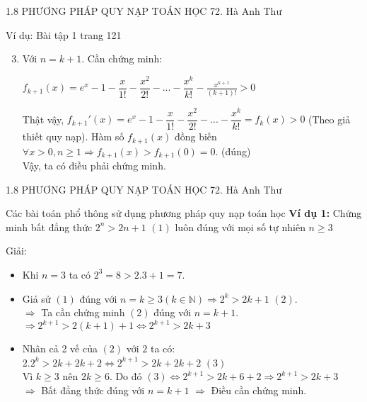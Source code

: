 \begin{frame}{1.8 PHƯƠNG PHÁP QUY NẠP TOÁN HỌC \hspace{2cm}  72. Hà Anh Thư} 
\begin{block}{Ví dụ: Bài tập 1 trang 121}
\begin{enumerate}
    \setcounter{enumi}{2}
    \item Với $n = k + 1$. Cần chứng minh:
    \begin{center}
        $f_{k + 1}(x) = e^x - 1 - \dfrac{x}{1!} - \dfrac{x^2}{2!} - ... - \dfrac{x^k}{k!} - \frac{x^{k + 1}}{(k + 1)!} > 0$
    \end{center}
    \pause
    Thật vậy,
    $f_{k + 1}'(x) = e^x - 1 - \dfrac{x}{1!} - \dfrac{x^2}{2!} - ... - \dfrac{x^k}{k!} = f_k(x) > 0$ (Theo giả thiết quy nạp).
    \pause
    Hàm số $f_{k + 1}(x)$ đồng biến $\forall x > 0, n \ge 1 \Rightarrow f_{k + 1}(x) > f_{k + 1}(0) = 0$. (đúng) \\
    Vậy, ta có điều phải chứng minh.
\end{enumerate}
\end{block}

\end{frame}

\begin{frame}{1.8 PHƯƠNG PHÁP QUY NẠP TOÁN HỌC \hspace{2cm}  72. Hà Anh Thư} 
\begin{block}{Các bài toán phổ thông sử dụng phương pháp quy nạp toán học}
\textbf{Ví dụ 1:} Chứng minh bất đẳng thức $2^n > 2n + 1$ $(1)$ luôn đúng với mọi số tự nhiên $n \ge 3$ \\
\pause
\begin{center}
    Giải:
\end{center}
\begin{itemize}
    \item Khi $n = 3$ ta có $2^3 = 8 > 2.3 + 1 = 7$.
    \pause
    \item Giả sử $(1)$ đúng với $n = k \ge 3 (k \in \mathbb{N}) \Rightarrow 2^k > 2k + 1$ $(2)$. \\
        \pause
        $\Rightarrow$ Ta cần chứng minh $(2)$ đúng với $n = k + 1$. \\
        \pause
        $\Rightarrow 2^{k + 1} > 2(k + 1) + 1 \Leftrightarrow 2^{k + 1} > 2k + 3$ \\
        \pause
    \item Nhân cả 2 vế của $(2)$ với $2$ ta có: \\
        $2.2^k > 2k + 2k + 2 \Leftrightarrow 2^{k + 1} > 2k + 2k + 2$ $(3)$ \\
        \pause
        Vì $k \ge 3$ nên $2k \ge 6$. Do đó $(3) \Leftrightarrow 2^{k + 1} > 2k + 6 + 2 \Rightarrow 2^{k + 1} > 2k + 3$ \\
        $\Rightarrow$ Bất đẳng thức đúng với $n = k + 1$ $\Rightarrow$ Điều cần chứng minh.
\end{itemize}
\end{block}

\end{frame}

